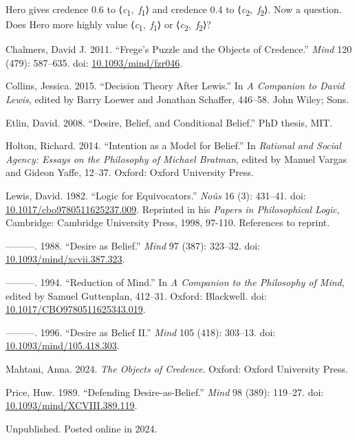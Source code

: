 \documentclass[
  10pt,
  letterpaper,
  DIV=11,
  numbers=noendperiod,
  twoside]{scrartcl}
\newlength{\cslhangindent}
\newenvironment{CSLReferences}[2] %
 {\begin{list}{}{%
  \setlength{\itemindent}{0pt}
  \setlength{\leftmargin}{0pt}
  \setlength{\parsep}{0pt}
  \ifodd #1
   \setlength{\leftmargin}{\cslhangindent}
   \setlength{\itemindent}{-1\cslhangindent}
  \fi
  \setlength{\itemsep}{#2\baselineskip}}}
 {\end{list}}
\begin{document}
Hero gives credence 0.6 to
⟨\emph{c}\textsubscript{1},~\emph{f}\textsubscript{1}⟩ and credence 0.4
to ⟨\emph{c}\textsubscript{2},~\emph{f}\textsubscript{2}⟩. Now a
question. Does Hero more highly value
⟨\emph{c}\textsubscript{1},~\emph{f}\textsubscript{1}⟩ or
⟨\emph{c}\textsubscript{2},~\emph{f}\textsubscript{2}⟩?

\label{refs}
\begin{CSLReferences}{1}{0}
Chalmers, David J. 2011. {``Frege's Puzzle and the Objects of
Credence.''} \emph{Mind} 120 (479): 587--635. doi:
\href{https://doi.org/10.1093/mind/fzr046}{10.1093/mind/fzr046}.

Collins, Jessica. 2015. {``Decision Theory After Lewis.''} In \emph{A
Companion to David Lewis}, edited by Barry Loewer and Jonathan Schaffer,
446--58. John Wiley; Sons.

Etlin, David. 2008. {``Desire, Belief, and Conditional Belief.''} PhD
thesis, MIT.

Holton, Richard. 2014. {``Intention as a Model for Belief.''} In
\emph{Rational and Social Agency: Essays on the Philosophy of Michael
Bratman}, edited by Manuel Vargas and Gideon Yaffe, 12--37. Oxford:
Oxford University Press.

Lewis, David. 1982. {``Logic for Equivocators.''} \emph{No{û}s} 16 (3):
431--41. doi:
\href{https://doi.org/10.1017/cbo9780511625237.009}{10.1017/cbo9780511625237.009}.
Reprinted in his \emph{Papers in Philosophical Logic}, Cambridge:
Cambridge University Press, 1998, 97-110. References to reprint.

---------. 1988. {``Desire as Belief.''} \emph{Mind} 97 (387): 323--32.
doi:
\href{https://doi.org/10.1093/mind/xcvii.387.323}{10.1093/mind/xcvii.387.323}.

---------. 1994. {``Reduction of Mind.''} In \emph{A Companion to the
Philosophy of Mind}, edited by Samuel Guttenplan, 412--31. Oxford:
Blackwell. doi:
\href{https://doi.org/10.1017/CBO9780511625343.019}{10.1017/CBO9780511625343.019}.

---------. 1996. {``Desire as Belief {II}.''} \emph{Mind} 105 (418):
303--13. doi:
\href{https://doi.org/10.1093/mind/105.418.303}{10.1093/mind/105.418.303}.

Mahtani, Anna. 2024. \emph{The Objects of Credence}. Oxford: Oxford
University Press.

Price, Huw. 1989. {``Defending Desire-as-Belief.''} \emph{Mind} 98
(389): 119--27. doi:
\href{https://doi.org/10.1093/mind/XCVIII.389.119}{10.1093/mind/XCVIII.389.119}.

\end{CSLReferences}



\noindent Unpublished. Posted online in 2024.
\end{document}
